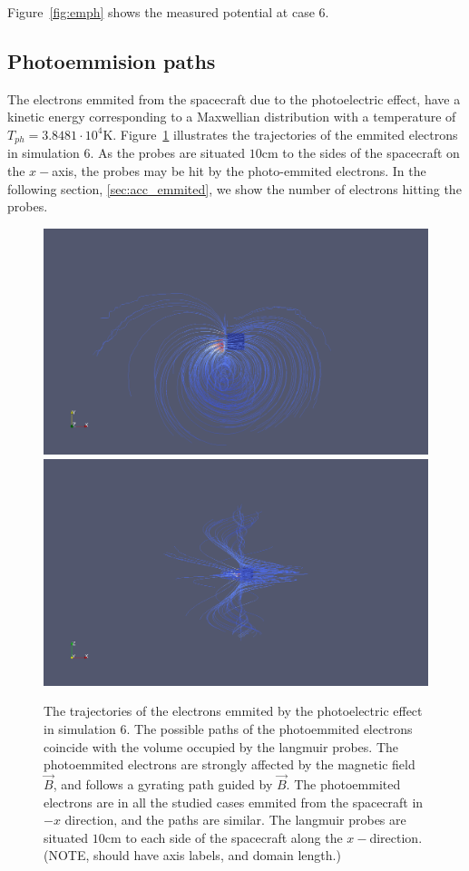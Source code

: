 	Figure~\ref{fig:emph} shows the measured potential at case \(6\).

\subsection{Photoemmision paths}

	The electrons emmited from the spacecraft due to the photoelectric effect, have a kinetic
	energy corresponding to a Maxwellian distribution with a temperature of \(T_{ph} =  3.8481\cdot 10^{4} \text{K}\).
	Figure~\ref{fig:trajectories} illustrates the trajectories of the emmited electrons in simulation \(6\).
	As the probes are situated \(10 \text{cm}\) to the sides of the spacecraft on the \(x-\)axis, the probes
	may be hit by the photo-emmited electrons. In the following section, \ref{sec:acc_emmited}, we show the number of electrons hitting
	the probes.


	\begin{figure}
		\includegraphics[width = 0.49 \textwidth]{images/case6_jph_paths}
		\includegraphics[width = 0.49 \textwidth]{images/case6_jph_paths_2}
		\caption{The trajectories of the electrons emmited by the photoelectric effect in simulation \(6\). The possible
		paths of the photoemmited electrons coincide with the volume occupied by the langmuir probes. The photoemmited electrons are strongly affected by the magnetic
		field \(\vec{B}\), and follows a gyrating path guided by \(\vec{B}\). The photoemmited electrons are in all the studied cases
		emmited from the spacecraft in \(-x\) direction, and the paths are similar. The langmuir probes are situated \(10 \text{cm}\) to each side
		of the spacecraft along the \(x-\)direction. (NOTE, should have axis labels, and domain length.)}
		\label{fig:trajectories}
	\end{figure}


